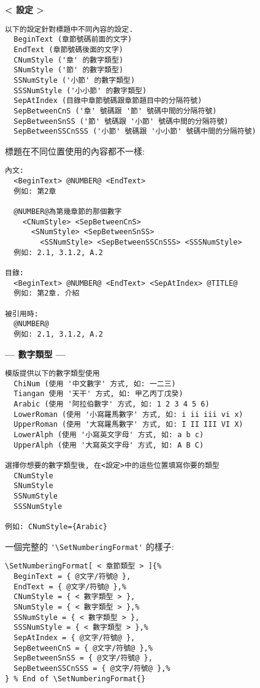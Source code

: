 \begin{enumerate}
{  \newpage
    \textbf{< 設定 >}
    \begin{DescriptionFrame}
    \begin{verbatim}
以下的設定針對標題中不同內容的設定.
  BeginText (章節號碼前面的文字)
  EndText (章節號碼後面的文字)
  CNumStyle ('章' 的數字類型)
  SNumStyle ('節' 的數字類型)
  SSNumStyle ('小節' 的數字類型)
  SSSNumStyle ('小小節' 的數字類型)
  SepAtIndex (目錄中章節號碼跟章節題目中的分隔符號)
  SepBetweenCnS ('章' 號碼跟 '節' 號碼中間的分隔符號)
  SepBetweenSnSS ('節' 號碼跟 '小節' 號碼中間的分隔符號)
  SepBetweenSSCnSSS ('小節' 號碼跟 '小小節' 號碼中間的分隔符號)
    \end{verbatim}
    \end{DescriptionFrame}

    標題在不同位置使用的內容都不一樣:
    \begin{DescriptionFrame}
    \begin{verbatim}
內文:
  <BeginText> @NUMBER@ <EndText>
  例如: 第2章

  @NUMBER@為第幾章節的那個數字
    <CNumStyle> <SepBetweenCnS>
      <SNumStyle> <SepBetweenSnSS>
        <SSNumStyle> <SepBetweenSSCnSSS> <SSSNumStyle>
  例如: 2.1, 3.1.2, A.2

目錄:
  <BeginText> @NUMBER@ <EndText> <SepAtIndex> @TITLE@
  例如: 第2章. 介紹

被引用時:
  @NUMBER@
  例如: 2.1, 3.1.2, A.2
    \end{verbatim}
    \end{DescriptionFrame}

  \newpage
    \textbf{--- 數字類型 ---}
    \begin{DescriptionFrame}
    \begin{verbatim}
模版提供以下的數字類型使用
  ChiNum (使用 '中文數字' 方式, 如: 一二三)
  Tiangan 使用 '天干' 方式, 如: 甲乙丙丁戊癸)
  Arabic (使用 '阿拉伯數字' 方式, 如: 1 2 3 4 5 6)
  LowerRoman (使用 '小寫羅馬數字' 方式, 如: i ii iii vi x)
  UpperRoman (使用 '大寫羅馬數字' 方式, 如: I II III VI X)
  LowerAlph (使用 '小寫英文字母' 方式, 如: a b c)
  UpperAlph (使用 '大寫英文字母' 方式, 如: A B C)

選擇你想要的數字類型後, 在<設定>中的這些位置填寫你要的類型
  CNumStyle
  SNumStyle
  SSNumStyle
  SSSNumStyle
  
例如: CNumStyle={Arabic}
    \end{verbatim}
    \end{DescriptionFrame}

    一個完整的 \verb|'\SetNumberingFormat'| 的樣子:
    \begin{DescriptionFrame}
    \begin{verbatim}
\SetNumberingFormat[ < 章節類型 > ]{%
  BeginText = { @文字/符號@ },
  EndText = { @文字/符號@ },%
  CNumStyle = { < 數字類型 > },
  SNumStyle = { < 數字類型 > },%
  SSNumStyle = { < 數字類型 > },
  SSSNumStyle = { < 數字類型 > },%
  SepAtIndex = { @文字/符號@ },
  SepBetweenCnS = { @文字/符號@ },%
  SepBetweenSnSS = { @文字/符號@ },
  SepBetweenSSCnSSS = { @文字/符號@ },%
} % End of \SetNumberingFormat{}
    \end{verbatim}
    \end{DescriptionFrame}

}
\end{enumerate}
